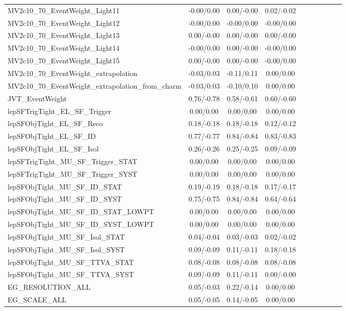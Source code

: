 \begin{table}[h]
\begin{center}
\begin{tabular}{l|ccccccccc}
MV2c10\_70\_EventWeight\_Light11 &-0.00/0.00 &0.00/-0.00 &0.02/-0.02 \\
MV2c10\_70\_EventWeight\_Light12 &-0.00/0.00 &-0.00/0.00 &-0.00/0.00 \\
MV2c10\_70\_EventWeight\_Light13 &0.00/-0.00 &0.00/-0.00 &0.00/-0.00 \\
MV2c10\_70\_EventWeight\_Light14 &-0.00/0.00 &0.00/-0.00 &-0.00/0.00 \\
MV2c10\_70\_EventWeight\_Light15 &0.00/-0.00 &0.00/-0.00 &-0.00/0.00 \\
MV2c10\_70\_EventWeight\_extrapolation &-0.03/0.03 &-0.11/0.11 &0.00/0.00 \\
MV2c10\_70\_EventWeight\_extrapolation\_from\_charm &-0.03/0.03 &-0.10/0.10 &0.00/0.00 \\
JVT\_EventWeight &0.76/-0.78 &0.58/-0.61 &0.60/-0.60 \\
lepSFTrigTight\_EL\_SF\_Trigger &0.00/0.00 &0.00/0.00 &0.00/0.00 \\
lepSFObjTight\_EL\_SF\_Reco &0.18/-0.18 &0.18/-0.18 &0.12/-0.12 \\
lepSFObjTight\_EL\_SF\_ID &0.77/-0.77 &0.84/-0.84 &0.83/-0.83 \\
lepSFObjTight\_EL\_SF\_Isol &0.26/-0.26 &0.25/-0.25 &0.09/-0.09 \\
lepSFTrigTight\_MU\_SF\_Trigger\_STAT &0.00/0.00 &0.00/0.00 &0.00/0.00 \\
lepSFTrigTight\_MU\_SF\_Trigger\_SYST &0.00/0.00 &0.00/0.00 &0.00/0.00 \\
lepSFObjTight\_MU\_SF\_ID\_STAT &0.19/-0.19 &0.18/-0.18 &0.17/-0.17 \\
lepSFObjTight\_MU\_SF\_ID\_SYST &0.75/-0.75 &0.84/-0.84 &0.64/-0.64 \\
lepSFObjTight\_MU\_SF\_ID\_STAT\_LOWPT &0.00/0.00 &0.00/0.00 &0.00/0.00 \\
lepSFObjTight\_MU\_SF\_ID\_SYST\_LOWPT &0.00/0.00 &0.00/0.00 &0.00/0.00 \\
lepSFObjTight\_MU\_SF\_Isol\_STAT &0.04/-0.04 &0.03/-0.03 &0.02/-0.02 \\
lepSFObjTight\_MU\_SF\_Isol\_SYST &0.09/-0.09 &0.11/-0.11 &0.18/-0.18 \\
lepSFObjTight\_MU\_SF\_TTVA\_STAT &0.08/-0.08 &0.08/-0.08 &0.08/-0.08 \\
lepSFObjTight\_MU\_SF\_TTVA\_SYST &0.09/-0.09 &0.11/-0.11 &0.00/-0.00 \\
EG\_RESOLUTION\_ALL &0.05/-0.03 &0.22/-0.14 &0.00/0.00 \\
EG\_SCALE\_ALL &0.05/-0.05 &0.14/-0.05 &0.00/0.00 \\

\end{tabular}
\end{center}
\end{table}

